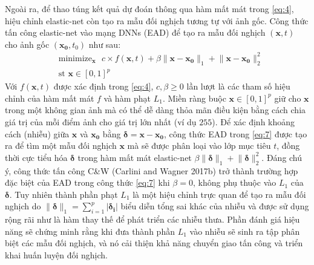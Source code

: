 Ngoài ra, để thao túng kết quả dự đoán thông qua hàm mất mát trong \ref{eq:4}, hiệu chỉnh 
elastic-net còn tạo ra mẫu đối nghịch tương tự với ảnh gốc. Công thức tấn công elastic-net
vào mạng DNNs (EAD) để tạo ra mẫu đối nghịch $(\mathbf{x},t)$ cho ảnh gốc $(\mathbf{x_0}, t_0)$ như sau:
\begin{equation}
    \label{eq:7}
    \begin{split}
    &\text{minimize}_{\mathbf{x}} \text{ }
    c \times f(\mathbf{x}, t) + \beta \lVert \mathbf{x} - \mathbf{x_0} \rVert_1
    + \lVert \mathbf{x} - \mathbf{x_0} \rVert_2^2 \\
    &\text{st   } \mathbf{x} \in [0,1]^p
    \end{split}
\end{equation}
Với $f(\mathbf{x},t)$ được xác định trong \ref{eq:4}, $c, \beta \geq 0$ lần lượt 
là các tham số  hiệu chỉnh của hàm mất mát $f$ và hàm phạt $L_1$. Miền ràng buộc 
$\mathbf{x} \in [0,1]^p$ giữ cho $\mathbf{x}$ trong một không gian ảnh mà có thể dễ dàng thỏa mãn điều kiện
bằng cách chia giá trị của mỗi điểm ảnh cho giá trị lớn nhất (ví dụ $255$). Để xác định khoảng 
cách (nhiễu) giữa $\mathbf{x}$ và $\mathbf{x_0}$ bằng $\mathbf{\delta} = \mathbf{x} - \mathbf{x_0}$,
công thức EAD trong \ref{eq:7} được tạo ra để tìm một mẫu đối nghịch $\mathbf{x}$ mà sẽ 
được phân loại vào lớp mục tiêu $t$, đồng thời cực tiểu hóa $\mathbf{\delta}$ trong hàm
mất mát elastic-net $\beta \lVert \mathbf{\delta} \rVert_1 + \lVert \mathbf{\delta} \rVert_2^2$.
Đáng chú ý, công thức tấn công C\&W (Carlini and Wagner 2017b) trở thành trường hợp đặc biệt 
của EAD trong công thức \ref{eq:7} khi $\beta = 0$, không phụ thuộc vào $L_1$ của $\mathbf{\delta}$.
Tuy nhiên thành phần phạt $L_1$ là một hiệu chỉnh trực quan để tạo ra mẫu đối nghịch do 
$\lVert \mathbf{\delta} \rVert_1 = \sum_{i=1}^p |\mathbf{\delta_i}|$ biểu diễn tổng sai khác
của nhiễu và được sử dụng rộng rãi như là hàm thay thế để phát triển các nhiễu thưa. 
Phần đánh giá hiệu năng sẽ chứng minh rằng khi đưa thành phần $L_1$ vào nhiễu sẽ sinh ra 
tập phân biệt các mẫu đối nghịch, và nó cải thiện khả năng chuyển giao tấn công và triển 
khai huấn luyện đối nghịch.


